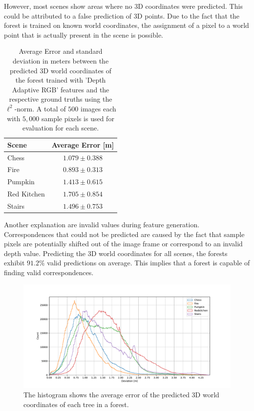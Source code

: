 \documentclass[final]{cvpr}
\begin{document}
However, most scenes show areas where no 3D coordinates
were predicted. This could be attributed to a false prediction of 3D points. Due to the fact that the forest is 
trained on known world coordinates, the assignment of a pixel to a world point that is actually present in the 
scene is possible. 

\begin{table}
	\begin{center}
	\begin{tabular}{|l|c|}
	\hline
	Scene & Average Error [m]\\
	\hline\hline
	Chess 		& 	$1.079 \pm 0.388$ \\
	Fire 		& 	$0.893 \pm 0.313$	\\
	Pumpkin 	& 	$1.413 \pm 0.615$ \\
	Red Kitchen 	& 	$1.705 \pm 0.854$ \\
	Stairs 		& 	$1.496 \pm 0.753$ \\
	\hline
	\end{tabular}
	\end{center}
	\caption{Average Error and standard deviation in meters between the predicted 3D world coordinates of the 
	forest trained with 
	'Depth Adaptive RGB' features and the respective ground truths using the $\ell^2$-norm. A total of
	$500$ images each with $5,000$ sample pixels is used for evaluation for each scene.}
	\label{tab:forest-error}
\end{table}

Another explanation are invalid values during feature generation. Correspondences that could not be predicted are
caused by the fact that sample pixels are potentially shifted out of the image frame or correspond to an invalid depth value. 
Predicting the 3D world coordinates for all scenes, the forests exhibit $91.2\%$ valid predictions on average. 
This implies that a forest is capable of finding valid correspondences.

\begin{figure}
	\begin{center}
	\includegraphics[width=\textwidth]{images/hist.pdf}
	\end{center}
	\caption{The histogram shows the average error of the predicted 3D world coordinates of each tree in a forest. }
	\label{fig:error-hist}
\end{figure}
\end{document}
